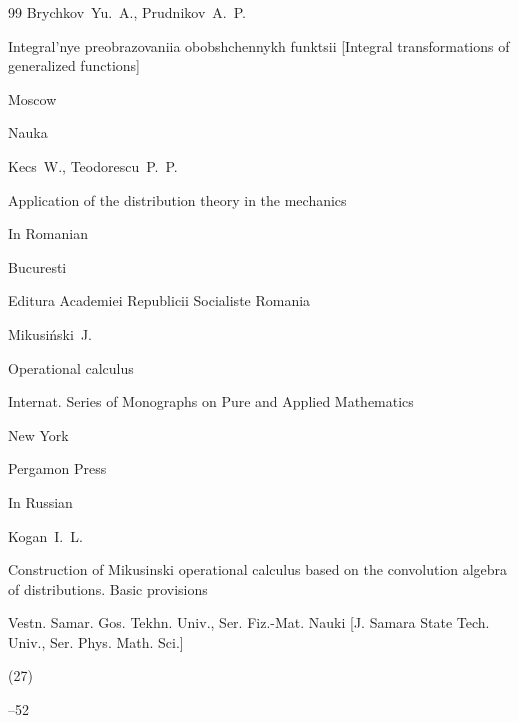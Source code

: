 \begin{thebibliography}{99}
\by Brychkov~Yu.~A., Prudnikov~A.~P.

\book Integral'nye preobrazovaniia obobshchennykh funktsii \rm [Integral transformations of generalized functions]

\publaddr Moscow

\publ Nauka






\by Kecs~W., Teodorescu~P.~P.

\book Application of the distribution theory in the mechanics

\lang In Romanian

\publaddr Bucuresti

\publ Editura Academiei Republicii Socialiste Romania







\by Mikusi\'nski~J.

\book Operational calculus

\serial Internat. Series of Monographs on Pure and Applied Mathematics


\publaddr New York

\publ Pergamon Press







\lang In Russian

\by Kogan~I.~L.

\paper Construction of Mikusinski operational calculus based on the convolution algebra of distributions. Basic provisions

\jour Vestn. Samar. Gos. Tekhn. Univ., Ser. Fiz.-Mat. Nauki \rm [J. Samara State Tech. Univ., Ser. Phys. Math. Sci.]


(27)

--52



\end{thebibliography}
